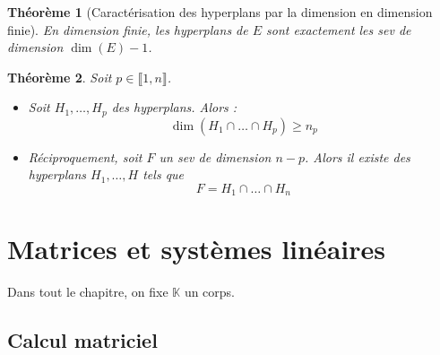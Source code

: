 \documentclass[french]{book}
\newcommand{\K}{\mathbb{K}}
\theoremstyle{plain}
\newtheorem{thm}{Théorème}[chapter]
\theoremstyle{definition}
\theoremstyle{remark}
\begin{document}
\begin{thm}[Caractérisation des hyperplans par la dimension en dimension finie]
	En dimension finie, les hyperplans de $E$ sont exactement les sev de dimension $\dim(E)-1$.
\end{thm}
\begin{thm}
	Soit $p\in\llbracket1,n\rrbracket$. 
	\begin{itemize}
		\item Soit $H_1,\ldots,H_p$ des hyperplans. Alors : $$\dim(H_1\cap\ldots\cap H_p)\geqslant n_p$$
		\item Réciproquement, soit $F$ un sev de dimension $n-p$. Alors il existe des hyperplans $H_1,\ldots,H$ tels que $$F=H_1\cap\ldots\cap H_n$$
	\end{itemize}
\end{thm}

\newpage
\chapter{Matrices et systèmes linéaires} %
Dans tout le chapitre, on fixe $\K$ un corps.
\section{Calcul matriciel}
\end{document}
